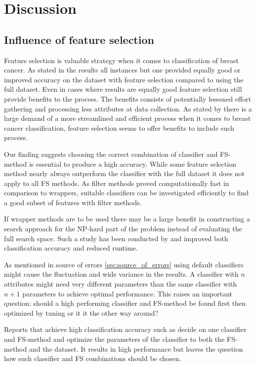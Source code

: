 \chapter{Discussion}

\section{Influence of feature selection}

Feature selection is valuable strategy when it comes to classification of breast cancer. As stated in the results all instances but one provided equally good or improved accuracy on the dataset with feature selection compared to using the full dataset. Even in cases where results are equally good feature selection still provide benefits to the process. The benefits consists of potentially lessened effort gathering and processing less attributes at data collection. As stated by \textcite{martei2018} there is a large demand of a more streamlined and efficient process when it comes to breast cancer classification, feature selection seems to offer benefits to include such process.

Our finding suggests choosing the correct combination of classifier and FS-method is essential to produce a high accuracy. While some feature selection method nearly always outperform the classifier with the full dataset it does not apply to all FS methods. As filter methods proved computationally fast in comparison to wrappers, suitable classifiers can be investigated efficiently to find a good subset of features with filter methods.

If wrapper methods are to be used there may be a large benefit in constructing a search approach for the NP-hard part of the problem instead of evaluating the full search space. Such a study has been conducted by \textcite{panthong2015} and improved both classification accuracy and reduced runtime.

As mentioned in source of errors \ref{sec:source_of_errors} using default classifiers might cause the fluctuation and wide variance in the results. A classifier with $n$ attributes might need very different parameters than the same classifier with $n + 1$ parameters to achieve optimal performance. This raises an important question: should a high performing classifier and FS-method be found first then optimized by tuning or it it the other way around?

Reports that achieve high classification accuracy such as \parencite{akay2009} decide on one classifier and FS-method and optimize the parameters of the classifier to both the FS-method and the dataset. It results in high performance but leaves the question how such classifier and FS combinations should be chosen.


